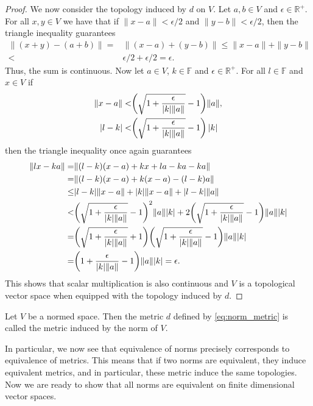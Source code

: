 \begin{proof}
	We now consider the topology induced by $d$ on $V$. Let $a,b\in V$ and $\epsilon\in\mathbb{R}^+$. For all $x,y\in V$ we have that if $\|x-a\|<\epsilon/2$ and $\|y-b\|<\epsilon/2$, then the triangle inequality guarantees
	\begin{align}
		\|(x+y)-(a+b)\|=&\|(x-a)+(y-b)\|\leq\|x-a\|+\|y-b\|\\
		<&\epsilon/2+\epsilon/2=\epsilon.
	\end{align}
Thus, the sum is continuous. Now let $a\in V$, $k\in\mathbb{F}$ and $\epsilon\in\mathbb{R}^+$. For all $l\in\mathbb{F}$ and $x\in V$ if 
	\begin{align}
	\begin{split}
		\|x-a\|<&\qty(\sqrt{1+\frac{\epsilon}{|k|\|a\|}}-1)\|a\|,\\
		|l-k|<&\qty(\sqrt{1+\frac{\epsilon}{|k|\|a\|}}-1)|k|
	\end{split}
	\end{align}
then the triangle inequality once again guarantees
	\begin{align}
	\begin{split}
		\|lx-ka\|=&\|(l-k)(x-a)+kx+la-ka-ka\|\\
		=&\|(l-k)(x-a)+k(x-a)-(l-k)a\|\\
		\leq&|l-k|\|x-a\|+|k|\|x-a\|+|l-k|\|a\|\\
		<&\qty(\sqrt{1+\frac{\epsilon}{|k|\|a\|}}-1)^2\|a\||k|+2\qty(\sqrt{1+\frac{\epsilon}{|k|\|a\|}}-1)\|a\||k|\\
		=&\qty(\sqrt{1+\frac{\epsilon}{|k|\|a\|}}+1)\qty(\sqrt{1+\frac{\epsilon}{|k|\|a\|}}-1)\|a\||k|\\
		=&\qty(1+\frac{\epsilon}{|k|\|a\|}-1)\|a\||k|=\epsilon.
	\end{split}
	\end{align}
This shows that scalar multiplication is also continuous and $V$ is a topological vector space when equipped with the topology induced by $d$. 
\end{proof}

\begin{definition}
	Let $V$ be a normed space. Then the metric $d$ defined by \eqref{eq:norm_metric} is called the metric induced by the norm of $V$.
\end{definition}

In particular, we now see that equivalence of norms precisely corresponds to equivalence of metrics. This means that if two norms are equivalent, they induce equivalent metrics, and in particular, these metric induce the same topologies. Now we are ready to show that all norms are equivalent on finite dimensional vector spaces.

